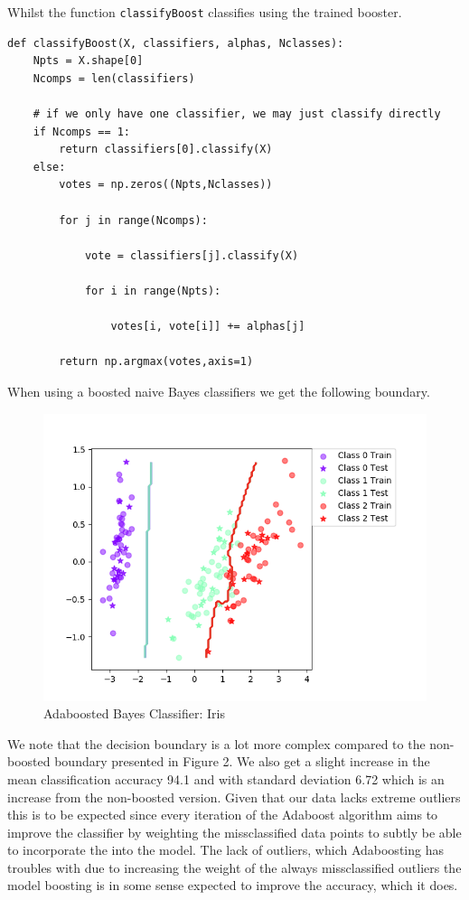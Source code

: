 \documentclass{article}
\begin{document}
Whilst the function \texttt{classifyBoost} classifies using the trained booster.

\begin{lstlisting}
def classifyBoost(X, classifiers, alphas, Nclasses):
    Npts = X.shape[0]
    Ncomps = len(classifiers)

    # if we only have one classifier, we may just classify directly
    if Ncomps == 1:
        return classifiers[0].classify(X)
    else:
        votes = np.zeros((Npts,Nclasses))
        
        for j in range(Ncomps):
            
            vote = classifiers[j].classify(X)
            
            for i in range(Npts):
                
                votes[i, vote[i]] += alphas[j]
            
        return np.argmax(votes,axis=1)
\end{lstlisting}

When using a boosted naive Bayes classifiers we get the following boundary.
        
\begin{figure}
    \centering
    \includegraphics[scale = 0.90]{BoostedBayesIrirs.png}
    \caption{Adaboosted Bayes Classifier: Iris}
\end{figure}

We note that the decision boundary is a lot more complex compared to the non-boosted boundary presented in Figure 2. We also get a slight increase in the mean classification accuracy 94.1 and with standard deviation 6.72 which is an increase from the non-boosted version. Given that our data lacks extreme outliers this is to be expected since every iteration of the Adaboost algorithm aims to improve the classifier by weighting the missclassified data points to subtly be able to incorporate the into the model. The lack of outliers, which Adaboosting has troubles with due to increasing the weight of the always missclassified outliers the model boosting is in some sense expected to improve the accuracy, which it does.
\end{document}
